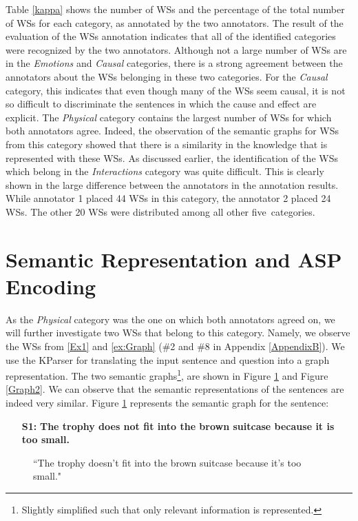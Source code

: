 Table \ref{kappa} shows the number of WSs  and the percentage of the total number of WSs for each category, as annotated by the two annotators. The result of the evaluation of the WSs annotation indicates that all of the identified categories were recognized by the two annotators. Although not a large number of WSs are in the \textit{Emotions} and \textit{Causal} categories, there is a strong agreement between the annotators about the WSs belonging in these two categories. For the \textit{Causal} category, this indicates that even though many of the WSs seem causal, it is not so difficult to discriminate the sentences in which the cause and effect are explicit. The \textit{Physical} category contains the largest number of WSs for which both annotators agree. Indeed, the observation of the semantic graphs for WSs from this category showed that there is a similarity in the knowledge that is represented with these WSs. As discussed earlier, the identification of the WSs which belong in the \textit{Interactions} category was quite difficult. This is clearly shown in the large difference between the annotators in the annotation results. While annotator 1 placed 44 WSs in this category, the annotator 2 placed 24 WSs. The other 20 WSs were distributed among all other five~categories.  



\section{Semantic Representation and ASP Encoding}
As the \textit{Physical} category was the one on which both annotators agreed on, we will further investigate two WSs that belong to this category. Namely, we observe the WSs from \ref{Ex1} and \ref{ex:Graph} (\#2 and \#8 in Appendix \ref{AppendixB}). 
We use the KParser for translating the input sentence and question into a graph representation.
The two semantic graphs\footnote{Slightly simplified such that only relevant information is represented.}, are shown in Figure \ref{Graph1} and Figure \ref{Graph2}. We can observe that the semantic representations of the sentences are indeed very similar. 
Figure \ref{Graph1} represents the semantic graph for the sentence:

\begin{itemize}
	\item[\textbf{S1:}] \textbf{The trophy does not fit into the brown suitcase because it is too small.}
\end{itemize}
\begin{figure} [h!]
	\centering
	
	\caption{\label{Graph1}``The trophy doesn't fit into the brown suitcase because it's too small."}
\end{figure}

